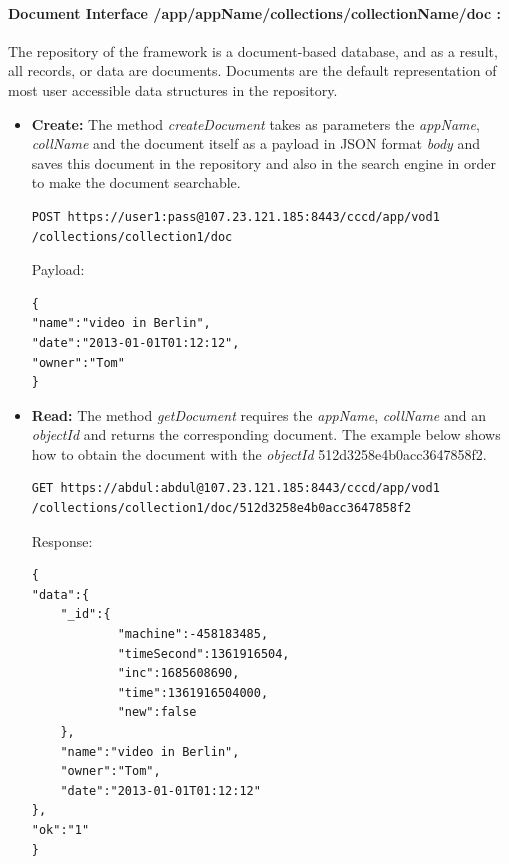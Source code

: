\paragraph{Document Interface /app/{appName}/collections/{collectionName}/doc :} The repository of the framework is a document-based database, and as a result, all records, or data are documents. Documents are the default representation of most user accessible data structures in the repository.

\begin{itemize}
\item \textbf{Create:} The method \textit{createDocument} takes as parameters  the \textit{appName}, \textit{collName} and  the document itself as a payload in \ac{JSON} format \textit{body} and saves this document in the repository and also in the search engine in order to make the document searchable.  

\begin{code}
\begin{verbatim}
POST https://user1:pass@107.23.121.185:8443/cccd/app/vod1
/collections/collection1/doc
\end{verbatim}
Payload:
\begin{verbatim}
{
"name":"video in Berlin",
"date":"2013-01-01T01:12:12",
"owner":"Tom"
}
\end{verbatim}
\end{code}


\item \textbf{Read:} The method \textit{getDocument} requires the \textit{appName}, \textit{collName} and an \textit{objectId} and returns the corresponding document. The example below shows how to obtain the document with the \textit{objectId} 512d3258e4b0acc3647858f2.

\begin{code}
\begin{verbatim}
GET https://abdul:abdul@107.23.121.185:8443/cccd/app/vod1
/collections/collection1/doc/512d3258e4b0acc3647858f2
\end{verbatim}
Response:
\begin{verbatim}
{
"data":{
	"_id":{
			"machine":-458183485,
			"timeSecond":1361916504,
			"inc":1685608690,
			"time":1361916504000,
			"new":false
	},
	"name":"video in Berlin",
	"owner":"Tom",
	"date":"2013-01-01T01:12:12"
},
"ok":"1"
}
\end{verbatim}
\end{code}


\end{itemize}
